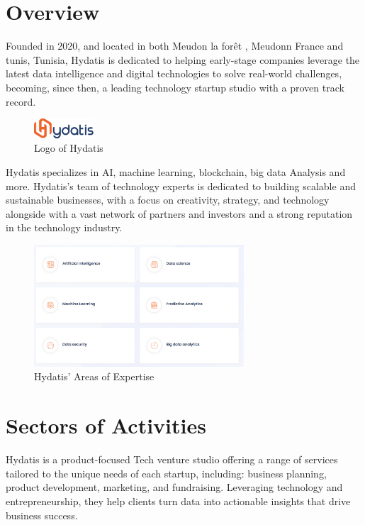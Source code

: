 \documentclass[12pt,a4paper,oneside,english]{book}
\begin{document}
{\label{ch:1er}
\section{Overview}
Founded in 2020, and located in both Meudon la forêt , Meudonn France and tunis, Tunisia, 
Hydatis is dedicated to helping early-stage companies leverage the latest data intelligence and digital technologies to solve real-world challenges, becoming, since then, a leading technology startup studio with a proven track record.
\begin{figure}[h!] %
    \centering
    \includegraphics[width=0.2\textwidth]{images/hydatiss.png}
    \caption{Logo of Hydatis}
    \label{fig:hydatis}
\end{figure}

Hydatis specializes in AI, machine learning, blockchain, big data Analysis and more. Hydatis's team of technology experts is dedicated to building scalable and sustainable businesses, with a focus on creativity, strategy, and technology alongside with a vast network of partners and investors and a strong reputation in the technology industry.
\begin{figure}[h!] %
    \centering
    \includegraphics[width=0.699\textwidth]{images/Expertise_hydatis.png}
    \caption{Hydatis' Areas of Expertise}
    \label{fig:Expertise_hydatis}
\end{figure}

\section{Sectors of Activities}%
Hydatis is a product-focused Tech venture studio offering a range of services tailored to the unique needs of each startup, including:
 business planning, product development, marketing, and fundraising. 
Leveraging technology and entrepreneurship, they help clients turn data into actionable insights that drive business success.
}
\end{document}
